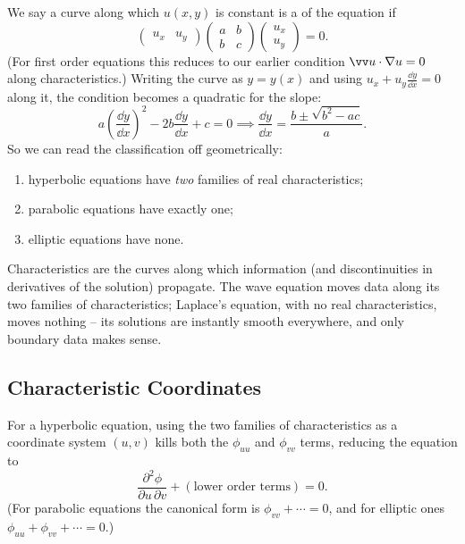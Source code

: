 We say a curve along which $u(x,y)$ is constant is a  of the equation if
$$
\begin{pmatrix} u_x & u_y \end{pmatrix} \begin{pmatrix} a & b \\ b & c\end{pmatrix}\begin{pmatrix} u_x \\ u_y\end{pmatrix} = 0.
$$
(For first order equations this reduces to our earlier condition $\vv u \cdot \nabla u = 0$ along characteristics.) Writing the curve as $y = y(x)$ and using $u_x + u_y \frac{\dd y}{\dd x} = 0$ along it, the condition becomes a quadratic for the slope:
$$
a \left(\frac{\dd y}{\dd x}\right)^2 - 2b \frac{\dd y}{\dd x} + c = 0 \implies \frac{\dd y}{\dd x} = \frac{b \pm \sqrt{b^2 - ac}}{a}.
$$
So we can read the classification off geometrically:
\begin{enumerate}[label=(\roman*)]
    \item hyperbolic equations have \emph{two} families of real characteristics;
    \item parabolic equations have exactly one;
    \item elliptic equations have none.
\end{enumerate}
Characteristics are the curves along which information (and discontinuities in derivatives of the solution) propagate. The wave equation moves data along its two families of characteristics; Laplace's equation, with no real characteristics, moves nothing -- its solutions are instantly smooth everywhere, and only boundary data makes sense.

\subsection{Characteristic Coordinates}

For a hyperbolic equation, using the two families of characteristics as a coordinate system $(u, v)$ kills both the $\phi_{uu}$ and $\phi_{vv}$ terms, reducing the equation to 
$$
\frac{\partial^2 \phi}{\partial u \, \partial v} + (\text{lower order terms}) = 0.
$$
(For parabolic equations the canonical form is $\phi_{vv} + \cdots = 0$, and for elliptic ones $\phi_{uu} + \phi_{vv} + \cdots = 0$.)

